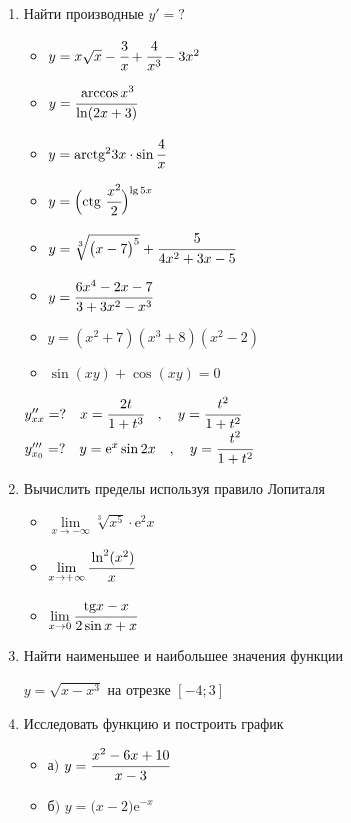 \documentclass{article}
\begin{document}
\begin{multicols}{2}
\begin{enumerate}[label=\arabic*.]
		\item Найти производные $y'=?$
		\begin{multicols}{2}
			\begin{itemize}[label=""]
				\item $y=x\sqrt{x}-\cfrac{3}{x}+\cfrac{4}{x^3}-3x^2$
				\item $y=\cfrac{\arccos x^3}{\ln (2x+3)}$
				\item $y=\mbox{arctg}^23x \cdot \sin \cfrac{4}{x}$
				\item $y=\Big(\mbox{ctg}\ \cfrac{x^2}{2}\Big)^{\lg 5x}$
			\end{itemize}
			\vfill\null\columnbreak
			\begin{itemize}[label=""]
				\item $y=\sqrt[3]{\big(x-7\big)^5} + \cfrac{5}{4x^2+3x-5}$
				\item $y=\cfrac{6x^4 - 2x -7}{3+3x^2-x^3}$
				\item $y=(x^2 + 7)(x^3 + 8)(x^2 - 2)$
				\item $\sin(xy) + \cos(xy) = 0$
			\end{itemize}
		\end{multicols}
		\vspace{-3mm}
		$y''_{xx}=? \quad x=\cfrac{2t}{1+t^3} \quad,\quad y=\cfrac{t^2}{1 + t^2}$ \\
		$y'''_{x_0}=? \quad y=\mbox{e}^x \sin 2x \quad,\quad y=\cfrac{t^2}{1 + t^2}$
		\item Вычислить пределы используя правило Лопиталя
		\begin{multicols}{3}
			\raggedcolumns
			\begin{itemize}[label=""]
				\item $\lim\limits_{x\to-\infty} \sqrt[3]{x^5}\cdot\mbox{e}^2x$
				\vfill\null\columnbreak
				\item $\lim\limits_{x\to+\infty}\cfrac{\ln^2(x^2)}{x}$
				\vfill\null\columnbreak
				\item $\lim\limits_{x\to 0}\cfrac{\mbox{tg}x - x}{2\sin x + x}$
				\vfill\null\columnbreak
			\end{itemize}
		\end{multicols}
		\vspace{-4mm}	
		\item Найти наименьшее и наибольшее значения функции
		
		$y=\sqrt{x-x^3}$ на отрезке $[-4;3]$
		\item Исследовать функцию и построить график
		\begin{multicols}{2}
			\begin{itemize}[label=""]
				\setlength\itemsep{0.5em}
				\item а$)$ $y=\cfrac{x^2-6x+10}{x-3}$
			\end{itemize}
			\vfill\null\columnbreak
			\begin{itemize}[label=""]
				\setlength\itemsep{0.5em}
				\item б$)$ $y=\big(x-2\big)\mbox{e}^{-x}$
			\end{itemize}
		\end{multicols}
	\end{enumerate}	
\end{multicols}
\end{document}
